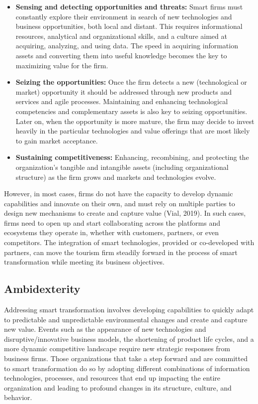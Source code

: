 \documentclass[
  letterpaper,
  DIV=11,
  numbers=noendperiod]{scrreprt}
\begin{document}
\begin{itemize}
\item
  \textbf{Sensing and detecting opportunities and threats:} Smart firms
  must constantly explore their environment in search of new
  technologies and business opportunities, both local and distant. This
  requires informational resources, analytical and organizational
  skills, and a culture aimed at acquiring, analyzing, and using data.
  The speed in acquiring information assets and converting them into
  useful knowledge becomes the key to maximizing value for the firm.
\item
  \textbf{Seizing the opportunities:} Once the firm detects a new
  (technological or market) opportunity it should be addressed through
  new products and services and agile processes. Maintaining and
  enhancing technological competencies and complementary assets is also
  key to seizing opportunities. Later on, when the opportunity is more
  mature, the firm may decide to invest heavily in the particular
  technologies and value offerings that are most likely to gain market
  acceptance.
\item
  \textbf{Sustaining competitiveness:} Enhancing, recombining, and
  protecting the organization's tangible and intangible assets
  (including organizational structure) as the firm grows and markets and
  technologies evolve.
\end{itemize}

However, in most cases, firms do not have the capacity to develop
dynamic capabilities and innovate on their own, and must rely on
multiple parties to design new mechanisms to create and capture value
(Vial, 2019). In such cases, firms need to open up and start
collaborating across the platforms and ecosystems they operate in,
whether with customers, partners, or even competitors. The integration
of smart technologies, provided or co-developed with partners, can move
the tourism firm steadily forward in the process of smart transformation
while meeting its business objectives.

\hypertarget{ambidexterity}{%
\subsection{Ambidexterity}\label{ambidexterity}}

Addressing smart transformation involves developing capabilities to
quickly adapt to predictable and unpredictable environmental changes and
create and capture new value. Events such as the appearance of new
technologies and disruptive/innovative business models, the shortening
of product life cycles, and a more dynamic competitive landscape require
new strategic responses from business firms. Those organizations that
take a step forward and are committed to smart transformation do so by
adopting different combinations of information technologies, processes,
and resources that end up impacting the entire organization and leading
to profound changes in its structure, culture, and behavior.
\end{document}
